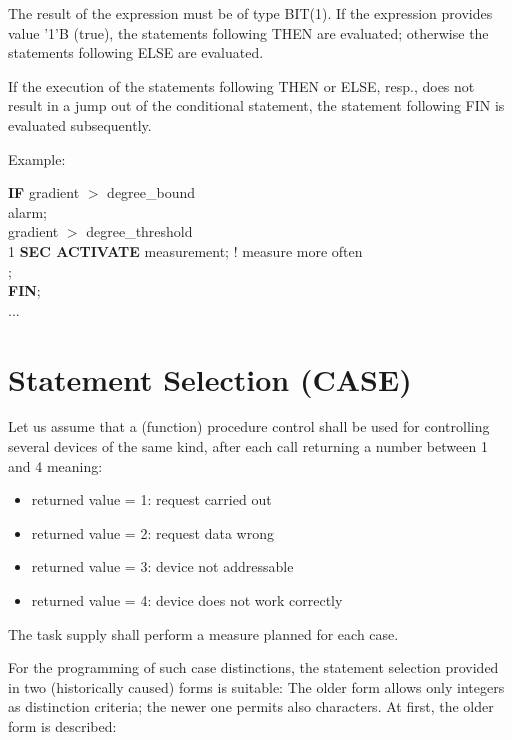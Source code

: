 The result of the expression must be of type BIT(1). If the expression
provides value '1'B (true), the statements following THEN are evaluated;
otherwise the statements following ELSE are evaluated.

If the execution of the statements following THEN or ELSE, resp., does
not result in a jump out of the conditional statement, the statement
following FIN is evaluated subsequently.

Example:

{\bf IF} gradient $>$ degree\_bound \\
 alarm;\\
 gradient $>$ degree\_threshold \\
\x \x {} 1 {\bf SEC ACTIVATE} measurement; ! measure more often\\
\x {};\\
{\bf FIN};\\
...

\section{Statement Selection (CASE)}  %
\label{sec_case}

Let us assume that a (function) procedure control shall be used for
controlling several devices of the same kind, after each call returning
a number between 1 and 4 meaning:
\begin{itemize}
\item returned value = 1: request carried out
\item returned value = 2: request data wrong
\item returned value = 3: device not addressable
\item returned value = 4: device does not work correctly
\end{itemize}

The task supply shall perform a measure planned for each case.

For the programming of such case distinctions, the statement selection
provided in two (historically caused) forms is suitable: The older form
allows only integers as distinction criteria; the newer one permits also
characters. At first, the older form is described:




